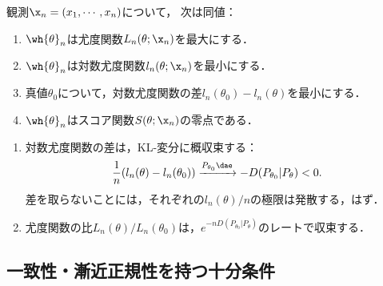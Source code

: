 \documentclass[uplatex,dvipdfmx]{jsreport}
\begin{document}
\begin{lemma}[最尤推定量の特徴付け]\label{lemma-characterization-of-MLE}
    観測$\x_n=(x_1,\cdots,x_n)$について，
    次は同値：
    \begin{enumerate}
        \item $\wh{\theta}_n$は尤度関数$L_n(\theta;\x_n)$を最大にする．
        \item $\wh{\theta}_n$は対数尤度関数$l_n(\theta;\x_n)$を最小にする．
        \item 真値$\theta_0$について，対数尤度関数の差$l_n(\theta_0)-l_n(\theta)$を最小にする．
        \item $\wh{\theta}_n$はスコア関数$S(\theta;\x_n)$の零点である．
    \end{enumerate}
\end{lemma}

\begin{lemma}[尤度関数の情報理論的な意味]\mbox{}
    \begin{enumerate}
        \item 対数尤度関数の差は，KL-変分に概収束する：
        \[\frac{1}{n}(l_n(\theta)-l_n(\theta_0))\xrightarrow{P_{\theta_0}\dae}-D(P_{\theta_0}|P_\theta)<0.\]
        差を取らないことには，それぞれの$l_n(\theta)/n$の極限は発散する，はず．
        \item 尤度関数の比$L_n(\theta)/L_n(\theta_0)$は，$e^{-nD(P_{\theta_0}|P_\theta)}$のレートで収束する．
    \end{enumerate}
\end{lemma}

\subsection{一致性・漸近正規性を持つ十分条件}
\end{document}
